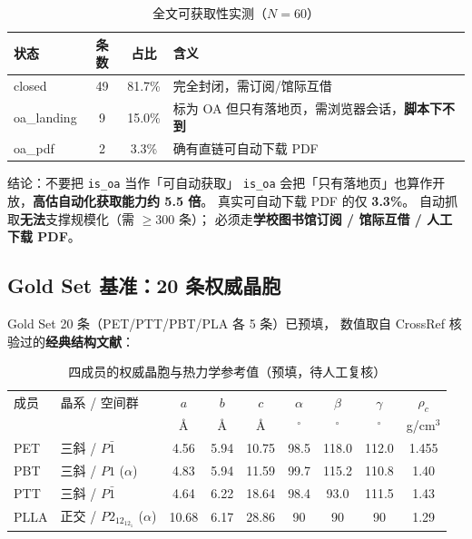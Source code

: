 \documentclass[11pt,a4paper]{ctexart}
\begin{document}
\begin{table}[htbp]
\centering
\caption{全文可获取性实测（$N=60$）}
\label{tab:oa}
\begin{tabular}{l c c l}
\toprule
状态 & 条数 & 占比 & 含义 \\
\midrule
closed      & 49 & 81.7\% & 完全封闭，需订阅/馆际互借 \\
oa\_landing &  9 & 15.0\% & 标为 OA 但只有落地页，需浏览器会话，\textbf{脚本下不到} \\
oa\_pdf     &  2 &  3.3\% & 确有直链可自动下载 PDF \\
\bottomrule
\end{tabular}
\end{table}

\begin{warnbox}{结论：不要把 \texttt{is\_oa} 当作「可自动获取」}
\texttt{is\_oa} 会把「只有落地页」也算作开放，\textbf{高估自动化获取能力约 5.5 倍}。
真实可自动下载 PDF 的仅 \textbf{3.3\%}。
自动抓取\textbf{无法}支撑规模化（需 $\ge 300$ 条）；
必须走\textbf{学校图书馆订阅 / 馆际互借 / 人工下载 PDF}。
\end{warnbox}

\subsection{Gold Set 基准：20 条权威晶胞}
Gold Set 20 条（PET/PTT/PBT/PLA 各 5 条）已预填，
数值取自 CrossRef 核验过的\textbf{经典结构文献}：

\begin{table}[htbp]
\centering
\caption{四成员的权威晶胞与热力学参考值（预填，待人工复核）}
\label{tab:cells}
\footnotesize
\begin{tabular}{l l c c c c c c c}
\toprule
成员 & 晶系 / 空间群 & $a$ & $b$ & $c$ & $\alpha$ & $\beta$ & $\gamma$ & $\rho_c$ \\
     &              & \AA{} & \AA{} & \AA{} & $^\circ$ & $^\circ$ & $^\circ$ & g/cm$^3$ \\
\midrule
PET  & 三斜 / $P\bar{1}$   & 4.56  & 5.94  & 10.75 & 98.5 & 118.0 & 112.0 & 1.455 \\
PBT  & 三斜 / $P1$ ($\alpha$) & 4.83  & 5.94  & 11.59 & 99.7 & 115.2 & 110.8 & 1.40  \\
PTT  & 三斜 / $P\bar{1}$   & 4.64  & 6.22  & 18.64 & 98.4 & 93.0  & 111.5 & 1.43  \\
PLLA & 正交 / $P2_12_12_1$ ($\alpha$) & 10.68 & 6.17 & 28.86 & 90 & 90 & 90 & 1.29 \\
\bottomrule
\end{tabular}
\end{table}
\end{document}
